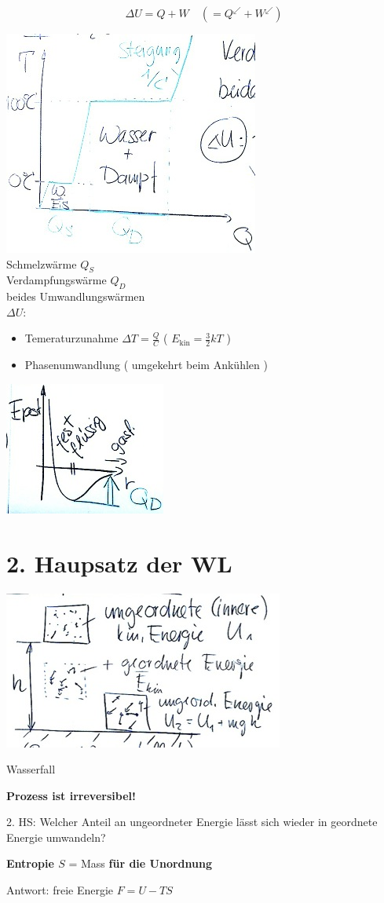 \begin{rep*}[ note = 1. Hauptsatz der Wärmelehre ]
	\[ \boxed{\Delta U = Q + W} \quad ( = Q^{\swarrow} + W^{\swarrow} ) \]
\end{rep*}

\begin{bsp*}[ note = \ce{H2O} ]
	\includegraphics{Bild144} \\
	Schmelzwärme $Q_S$ \\
	Verdampfungswärme $Q_D$ \\
	beides Umwandlungswärmen \\
	$\Delta U$:
	\begin{itemize}[ label = $\rightarrow$ ]
		\item Temeraturzunahme $\Delta T = \frac{Q}{C}$ ( $E_{\text{kin}} = \frac{3}{2} kT$ )
		\item Phasenumwandlung ( umgekehrt beim Ankühlen )
	\end{itemize}
	\includegraphics{Bild145}
\end{bsp*}

\section{2. Haupsatz der WL}
\includegraphics{Bild146} \\
\begin{bsp*}
	Wasserfall
\end{bsp*}
\textbf{Prozess ist irreversibel!}

2. HS: Welcher Anteil an ungeordneter Energie lässt sich wieder in geordnete Energie umwandeln?
\begin{def*}[ note = Entropie , index = Entropie S , indexformat = {1 2} ]
	\textbf{Entropie $S$} = Mass \textbf{für die Unordnung}
\end{def*}
Antwort: freie Energie $\boxed{F = U - TS}$

